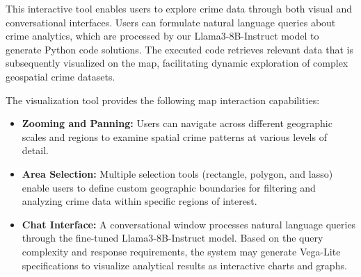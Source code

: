 This interactive tool enables users to explore crime data through both visual and conversational interfaces. Users can formulate natural language queries about crime analytics, which are processed by our Llama3-8B-Instruct model to generate Python code solutions. The executed code retrieves relevant data that is subsequently visualized on the map, facilitating dynamic exploration of complex geospatial crime datasets.

The visualization tool provides the following map interaction capabilities:
\begin{itemize}
  \item \textbf{Zooming and Panning:} Users can navigate across different geographic scales and regions to examine spatial crime patterns at various levels of detail.
  \item \textbf{Area Selection:} Multiple selection tools (rectangle, polygon, and lasso) enable users to define custom geographic boundaries for filtering and analyzing crime data within specific regions of interest.
  \item \textbf{Chat Interface:} A conversational window processes natural language queries through the fine-tuned Llama3-8B-Instruct model. Based on the query complexity and response requirements, the system may generate Vega-Lite specifications to visualize analytical results as interactive charts and graphs.
\end{itemize}
